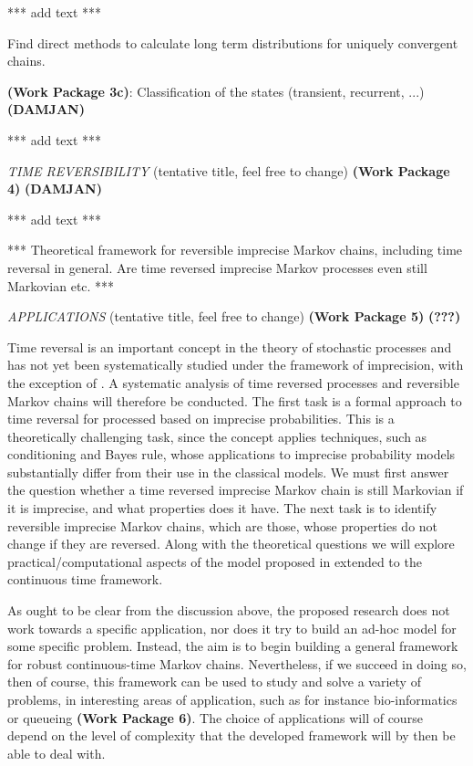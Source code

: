 \documentclass[11pt,dvipsnames,usenames,a4paper]{article}
\begin{document}
*** add text ***

Find direct methods to calculate long term distributions for uniquely convergent chains. 

{\bf (Work Package 3c)}: Classification of the states (transient, recurrent, ...) {\bf\color{blue} (DAMJAN)}

*** add text ***

\emph{TIME REVERSIBILITY} (tentative title, feel free to change) {\bf (Work Package 4)} 
{\bf\color{blue} (DAMJAN)}

*** add text ***

*** Theoretical framework for reversible imprecise Markov chains, including time reversal in general. Are time reversed imprecise Markov processes even still Markovian etc. ***

\emph{APPLICATIONS} (tentative title, feel free to change) {\bf (Work Package 5)} 
{\bf\color{blue} (???)}

Time reversal is an important concept in the theory of stochastic processes and has not yet been systematically studied under the framework of imprecision, with the exception of \cite{skulj:16}. A systematic analysis of time reversed processes and reversible Markov chains will therefore be conducted. The first task is a formal approach to time reversal for processed based on imprecise probabilities. This is a theoretically challenging task, since the concept applies techniques, such as conditioning and Bayes rule, whose applications to imprecise probability models substantially differ from their use in the classical models. We must first answer the question whether a time reversed imprecise Markov chain is still Markovian if it is imprecise, and what properties does it have. The next task is to identify reversible imprecise Markov chains, which are those, whose properties do not change if they are reversed. Along with the theoretical questions we will explore practical/computational aspects of the model proposed in \cite{skulj:16} extended to the continuous time framework. 


As ought to be clear from the discussion above, the proposed research does not work towards a specific application, nor does it try to build an ad-hoc model for some specific problem.
Instead, the aim is to begin building a general framework for robust continuous-time Markov chains.
Nevertheless, if we succeed in doing so, then of course, this framework can be used to study and solve a variety of problems, in interesting areas of application, such as for instance bio-informatics or queueing {\bf(Work Package 6)}. 
The choice of applications will of course depend on the level of complexity that the developed framework will by then be able to deal with.
\end{document}
